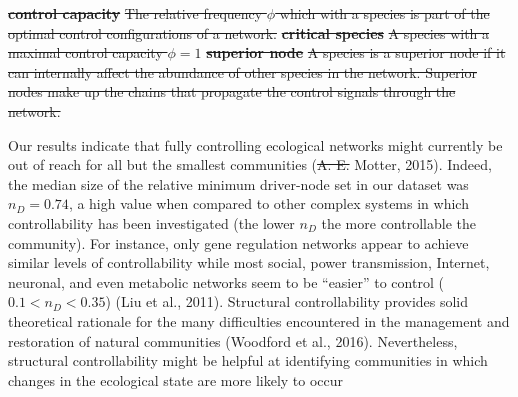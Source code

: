 \documentclass[a4paper]{artikel1}
\theoremstyle{definition}
\theoremstyle{definition}
\theoremstyle{definition}
\theoremstyle{remark}
\providecommand{\DIFaddtex}[1]{{\protect\color{blue}\uwave{#1}}} %
\providecommand{\DIFdeltex}[1]{{\protect\color{red}\sout{#1}}}                      %
\providecommand{\DIFaddbegin}{} %
\providecommand{\DIFaddend}{} %
\providecommand{\DIFdelbegin}{} %
\providecommand{\DIFdelend}{} %
\providecommand{\DIFdelFL}[1]{\DIFdel{#1}} %
\providecommand{\DIFadd}[1]{\texorpdfstring{\DIFaddtex{#1}}{#1}} %
\providecommand{\DIFdel}[1]{\texorpdfstring{\DIFdeltex{#1}}{}} %
\begin{document}
\textbf{\DIFdelFL{control capacity}} %
\DIFdelFL{\hspace{1em}The relative frequency \(\phi\) which with a species is part of the optimal control configurations of a network. }%
\textbf{\DIFdelFL{critical species}} %
\DIFdelFL{\hspace{1em}A species with a maximal control capacity \(\phi=1\) }%
\textbf{\DIFdelFL{superior node}} %
\DIFdelFL{\hspace{1em}A species is a superior node if it can internally affect the abundance of other species in the network. Superior nodes make up the chains that propagate the control signals through the network. }%

\DIFdelend Our results indicate that fully controlling ecological networks might
currently be out of reach for all but the smallest communities (\DIFdelbegin \DIFdel{A. E.
}\DIFdelend Motter,
2015). Indeed, the median size of the relative minimum driver-node set
in our dataset was \(n_D = 0.74\), a high value when compared to other
complex systems in which controllability has been investigated (the
lower \(n_D\) the more controllable the community). For instance, only
gene regulation networks appear to achieve similar levels of
controllability while most social, power transmission, Internet,
neuronal, and even metabolic networks seem to be ``easier'' to control
(\(0.1 < n_D < 0.35\)) (Liu et al., 2011). Structural controllability
provides solid theoretical rationale for the many difficulties
encountered in the management and restoration of natural communities
(Woodford et al., 2016). Nevertheless, structural controllability might
be helpful at identifying communities in which changes in the ecological
state are more likely to occur\DIFaddbegin \DIFadd{.
}\DIFaddend 
\end{document}
